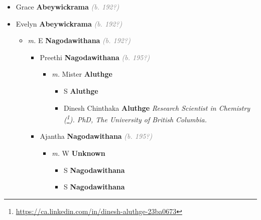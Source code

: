 \documentclass[10pt, openany]{book}
\begin{document}
\begin{itemize}
{\begin{itemize}
{\begin{itemize}
{\begin{itemize}
{\begin{itemize}
{\begin{itemize}
{ }
\end{itemize}}
\end{itemize}
 }
\end{itemize}}
\end{itemize}
  }
\item{Grace \textbf{Abeywickrama} \textcolor{gray}{\textit{(b. 192?)}}
 }
\item{Evelyn \textbf{Abeywickrama} \textcolor{gray}{\textit{(b. 192?)}}
\begin{itemize}
\item{\textit{m.} E \textbf{Nagodawithana} \textcolor{gray}{\textit{(b. 192?)}}   \label{couple:00000033:00000558} \begin{itemize}
\item{Preethi \textbf{Nagodawithana} \textcolor{gray}{\textit{(b. 195?)}}
\begin{itemize}
\item{\textit{m.} Mister \textbf{Aluthge} \textcolor{slorange}{\textit{}}   \label{couple:00000054:00000561} \begin{itemize}
\item{S \textbf{Aluthge} \textcolor{slorange}{\textit{}}
 }
\item{Dinesh Chinthaka \textbf{Aluthge} \textcolor{slorange}{\textit{}} \textcolor{slmaroon}{\textit{Research Scientist in Chemistry (\footnote{\url{https://ca.linkedin.com/in/dinesh-aluthge-23ba0673}}).
PhD, The University of British Columbia.}}
  }
\end{itemize}}
\end{itemize}
 }
\item{Ajantha \textbf{Nagodawithana} \textcolor{gray}{\textit{(b. 195?)}}
\begin{itemize}
\item{\textit{m.} W \textbf{Unknown} \textcolor{slorange}{\textit{}}   \label{couple:00000555:00000912} \begin{itemize}
\item{S \textbf{Nagodawithana} \textcolor{slorange}{\textit{}}
 }
\item{S \textbf{Nagodawithana} \textcolor{slorange}{\textit{}}
 }
\end{itemize}}
\end{itemize}
 }

\end{itemize}}
\end{itemize}}
\end{itemize}}
\end{itemize}
\end{document}
